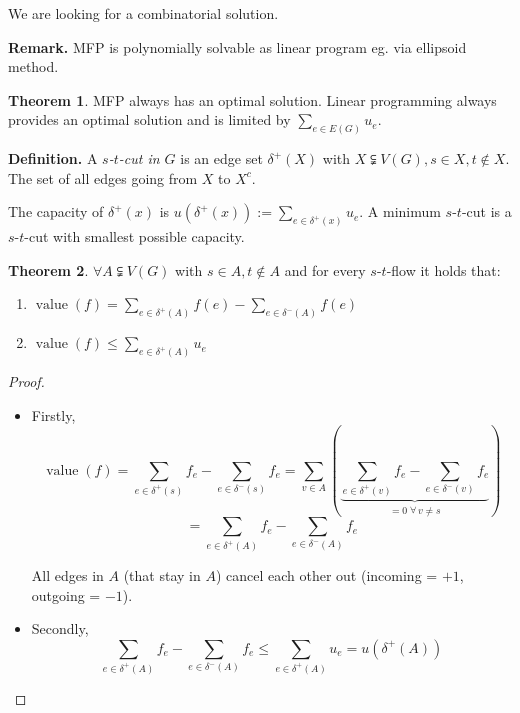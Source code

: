 \documentclass[a4paper]{article}
\theoremstyle{definition}
\newtheorem{theorem}{Theorem}
\newcommand{\fall}{\;\forall\,}
\begin{document}
We are looking for a combinatorial solution.

\textbf{Remark.} MFP is polynomially solvable as linear program eg. via ellipsoid method.

\begin{theorem}
  \label{proposition-4.1}
  MFP always has an optimal solution. Linear programming always provides an optimal solution and is limited by $\sum_{e \in E(G)} u_e$.
\end{theorem}

\textbf{Definition.}
  A \emph{$s$-$t$-cut in $G$} is an edge set $\delta^+(X)$ with $X \subsetneqq V(G), s \in X, t \notin X$. The set of all edges going from $X$ to $X^c$.

The capacity of $\delta^+(x)$ is $u(\delta^+(x)) := \sum_{e \in \delta^+(x)} u_e$.
A minimum $s$-$t$-cut is a $s$-$t$-cut with smallest possible capacity.

\begin{theorem}
  \label{lemma-4.2}
  $\forall A \subsetneqq V(G)$ with $s \in A, t \notin A$ and for every $s$-$t$-flow it holds that:
  \begin{enumerate}
    \item $\operatorname{value}{(f)} = \sum_{e \in \delta^+(A)} f(e) - \sum_{e \in \delta^-(A)} f(e)$
    \item $\operatorname{value}{(f)} \leq \sum_{e \in \delta^+(A)} u_e$
  \end{enumerate}
\end{theorem}

\begin{proof}
  \begin{itemize}
    \item Firstly, \[
        \operatorname{value}(f)
        = \sum_{e \in \delta^+(s)} f_e - \sum_{e \in \delta^-(s)} f_e
        = \sum_{v \in A} \left(
          \underbrace{\sum_{e \in \delta^+(v)} f_e - \sum_{e \in \delta^-(v)} f_e}%
            _{= 0 \fall v \neq s}
        \right)
      \] \[
        = \sum_{e \in \delta^+(A)} f_e - \sum_{e \in \delta^-(A)} f_e
      \]

      All edges in $A$ (that stay in $A$) cancel each other out
      (incoming = $+1$, outgoing = $-1$).
    \item Secondly, \[
      \sum_{e \in \delta^+(A)} f_e - \sum_{e \in \delta^-(A)} f_e
      \leq \sum_{e \in \delta^+(A)} u_e
      = u(\delta^+(A))
    \]
  \end{itemize}
\end{proof}
\end{document}
